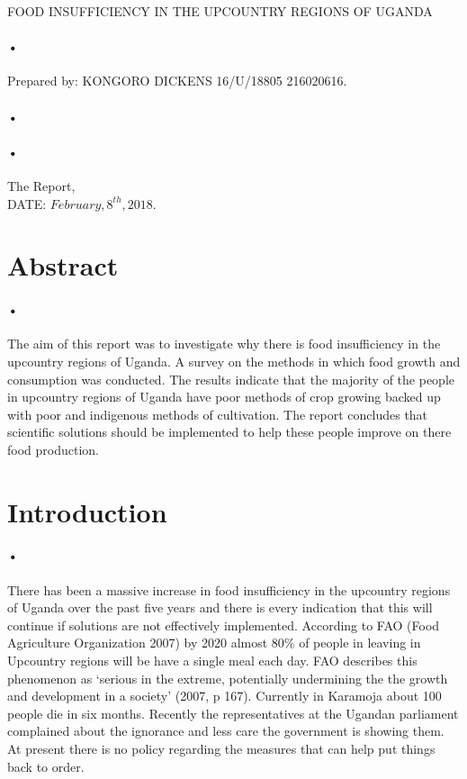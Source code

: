 \documentclass[12pt]{article}
\begin{document}
\begin{titlepage}
\centerline{FOOD INSUFFICIENCY IN THE UPCOUNTRY REGIONS OF UGANDA\\}
\paragraph*{•}
\centerline{  Prepared by: KONGORO DICKENS 16/U/18805 216020616.\\}
\paragraph*{•}
\paragraph*{•}
  \begin{flushright}
  The Report,\\
  DATE: $February,8^{th},2018$.
  \end{flushright}
\date{\today}
\end{titlepage}
\tableofcontents
\newpage

\section{Abstract}
\paragraph{•}The aim of this report was to investigate why there is food insufficiency in the upcountry regions of Uganda. A survey on the methods in which food growth and consumption was conducted. The results indicate that
the majority of the people in upcountry regions of Uganda have poor methods of crop growing backed up with poor and indigenous methods of cultivation. The report concludes that scientific solutions should be implemented to help these people improve on there food production.
\section{Introduction}
\paragraph{•}There has been a massive increase in food insufficiency in the upcountry regions of Uganda over the past five years and there is every indication that this will continue if solutions are not effectively implemented. According to FAO (Food Agriculture Organization 2007) by 2020 almost 80$\%$ of people in leaving in Upcountry  regions will be have a single meal each day. FAO describes this phenomenon as ‘serious in the extreme, potentially undermining the the growth and development in a society’ (2007, p 167). Currently in Karamoja about 100 people die in six months.
Recently the representatives at the Ugandan parliament  complained about the ignorance and less care the government is showing them.  At present there is no policy regarding the measures that can help put things back to order.
\end{document}
